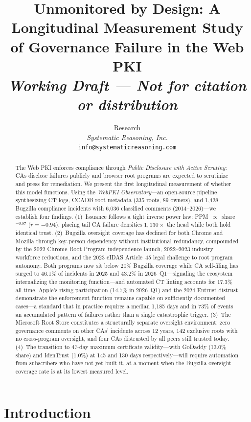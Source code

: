 \documentclass[10pt,twocolumn,letterpaper]{article}
\title{\Large\textbf{Unmonitored by Design: A Longitudinal Measurement Study\\of Governance Failure in the Web PKI}\\[0.5em]
\normalsize\textit{Working Draft --- Not for citation or distribution}}
\author{
Research\\
\textit{Systematic Reasoning, Inc.}\\
\texttt{info@systematicreasoning.com}
}
\date{}
\begin{document}
\maketitle

\begin{abstract}
The Web PKI enforces compliance through \textit{Public Disclosure with Active
Scrutiny}: CAs disclose failures publicly and browser root programs are expected
to scrutinize and press for remediation. We present the first longitudinal
measurement of whether this model functions. Using the \textit{WebPKI
Observatory}---an open-source pipeline synthesizing CT logs, CCADB root
metadata (335 roots, 89 owners), and 1,428 Bugzilla compliance incidents with
6,036 classified comments (2014--2026)---we establish four findings.
(1)~Issuance follows a tight inverse power law: PPM~$\propto$~share$^{-0.87}$
($r=-0.94$), placing tail CA failure densities $1{,}130\times$ the head while
both hold identical trust.
(2)~Bugzilla oversight coverage has declined for both Chrome and Mozilla
through key-person dependency without institutional redundancy, compounded
by the 2022 Chrome Root Program independence launch, 2022--2023 industry
workforce reductions, and the 2023 eIDAS Article~45 legal challenge to
root program autonomy. Both programs now sit below 20\% Bugzilla coverage
while CA self-filing has surged to 46.1\% of incidents in 2025 and
43.2\% in 2026~Q1---signaling the ecosystem internalizing the monitoring
function---and automated CT linting accounts for 17.3\% all-time.
Apple's rising participation (14.7\% in 2026~Q1) and the 2024 Entrust
distrust demonstrate the enforcement function remains capable on
sufficiently documented cases---a standard that in practice requires a
median 1,185 days and in 73\% of events an accumulated pattern of
failures rather than a single catastrophic trigger.
(3)~The Microsoft Root Store constitutes a structurally separate oversight
environment: zero governance comments on other CAs' incidents across 12 years,
142 exclusive roots with no cross-program oversight, and four CAs distrusted
by all peers still trusted today.
(4)~The transition to 47-day maximum certificate validity---with GoDaddy
(13.0\% share) and IdenTrust (1.0\%) at 145 and 130 days respectively---will
require automation from subscribers who have not yet built it, at a moment
when the Bugzilla oversight coverage rate is at its lowest measured level.
\end{abstract}

\section{Introduction}
\end{document}

